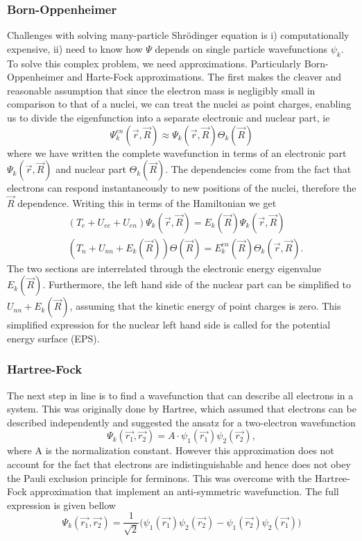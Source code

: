 \subsubsection{Born-Oppenheimer}
Challenges with solving many-particle Shr\"{o}dinger equation is i) computationally expensive, ii) need to know how $\Psi$ depends on single particle wavefunctions $\psi_k$. To solve this complex problem, we need approximations. Particularly Born-Oppenheimer and Harte-Fock approximations. The first makes the cleaver and reasonable assumption that since the electron mass is negligibly small in comparison to that of a nuclei, we can treat the nuclei as point charges, enabling us to divide the eigenfunction into a separate electronic and nuclear part, ie
\begin{equation}
    \Psi_{k}^{en}(\vec{r}, \vec{R}) \approx \Psi_k(\vec{r}, \vec{R}) \Theta_k(\vec{R})
\end{equation}
where we have written the complete wavefunction in terms of an electronic part $\Psi_k(\vec{r}, \vec{R})$ and nuclear part $\Theta_k(\vec{R})$. The dependencies come from the fact that electrons can respond instantaneously to new positions of the nuclei, therefore the $\vec{R}$ dependence. Writing this in terms of the Hamiltonian we get
\begin{align}
    &\left( T_{e} + U_{ee} + U_{en} \right) \Psi_k(\vec{r}, \vec{R}) = E_k(\vec{R})\Psi_k(\vec{r}, \vec{R}) \\
    &\left( T_{n} + U_{nn} + E_k(\vec{R}) \right) \Theta(\vec{R}) = E_{k}^{en}(\vec{R})\Theta_k(\vec{r}, \vec{R}).
\end{align}
The two sections are interrelated through the electronic energy eigenvalue $E_k(\vec{R})$. Furthermore, the left hand side of the nuclear part can be simplified to $U_{nn} + E_k(\vec{R})$, assuming that the kinetic energy of point charges is zero. This simplified expression for the nuclear left hand side is called for the potential energy surface (EPS).

\subsubsection{Hartree-Fock}
The next step in line is to find a wavefunction that can describe all electrons in a system. This was originally done by Hartree, which assumed that electrons can be described independently and suggested the ansatz for a two-electron wavefunction
\begin{equation}
    \Psi_k(\vec{r_1}, \vec{r_2}) = A \cdot \psi_1(\vec{r_1}) \psi_2(\vec{r_2}),
\end{equation}
where A is the normalization constant. However this approximation does not account for the fact that electrons are indistinguishable and hence does not obey the Pauli exclusion principle for ferminons. This was overcome with the Hartree-Fock approximation that implement an anti-symmetric wavefunction. The full expression is given bellow
\begin{equation}
    \Psi_k(\vec{r_1}, \vec{r_2}) = \frac{1}{\sqrt{2}} \Big( \psi_1(\vec{r_1}) \psi_2(\vec{r_2}) - \psi_1(\vec{r_2})\psi_2(\vec{r_1}) \Big)
\end{equation}

